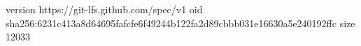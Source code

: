 version https://git-lfs.github.com/spec/v1
oid sha256:6231c413a8d64695fafcfe6f49244b122fa2d89cbbb031e16630a5e240192ffc
size 12033

